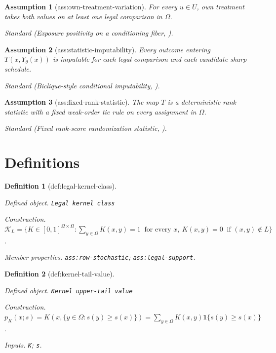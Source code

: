 \documentclass{article}
\newtheorem{assumption}{Assumption}
\newtheorem{definition}{Definition}
\begin{document}
\begin{assumption}[ass:own-treatment-variation]\label{ass:own-treatment-variation}
For every \(u\in U\), own treatment takes both values on at least one legal comparison in \(\Omega\).
\par\smallskip\noindent\emph{Standard} (Exposure positivity on a conditioning fiber, \cite{PuelzBasseFellerToulis2022Graph}).
\end{assumption}

\begin{assumption}[ass:statistic-imputability]\label{ass:statistic-imputability}
Every outcome entering \(T(x,Y_{\theta}(x))\) is imputable for each legal comparison and each candidate sharp schedule.
\par\smallskip\noindent\emph{Standard} (Biclique-style conditional imputability, \cite{PuelzBasseFellerToulis2022Graph}).
\end{assumption}

\begin{assumption}[ass:fixed-rank-statistic]\label{ass:fixed-rank-statistic}
The map \(T\) is a deterministic rank statistic with a fixed weak-order tie rule on every assignment in \(\Omega\).
\par\smallskip\noindent\emph{Standard} (Fixed rank-score randomization statistic, \cite{SuLi2024TreatmentEffectQuantiles}).
\end{assumption}

\section{Definitions}

\begin{definition}[def:legal-kernel-class]\label{def:legal-kernel-class}
\par\smallskip\noindent\emph{Defined object.} \texttt{Legal kernel class}
\par\smallskip\noindent\emph{Construction.} \(\mathcal{K}_L=\{K\in[0,1]^{\Omega\times\Omega}: \sum_{y\in\Omega}K(x,y)=1\ \text{ for every }x,\ K(x,y)=0\ \text{ if }(x,y)\notin L\}\).
\par\smallskip\noindent\emph{Member properties.} \texttt{ass:\allowbreak{}row-\allowbreak{}stochastic}; \texttt{ass:\allowbreak{}legal-\allowbreak{}support}.
\end{definition}

\begin{definition}[def:kernel-tail-value]\label{def:kernel-tail-value}
\par\smallskip\noindent\emph{Defined object.} \texttt{Kernel upper-\allowbreak{}tail value}
\par\smallskip\noindent\emph{Construction.} \(p_K(x;s)=K(x,\{y\in\Omega:s(y)\geq s(x)\})=\sum_{y\in\Omega}K(x,y)\mathbf{1}\{s(y)\geq s(x)\}\).
\par\smallskip\noindent\emph{Inputs.} \texttt{K}; \texttt{s}.
\end{definition}
\end{document}
